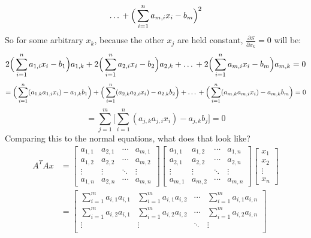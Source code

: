 \documentclass{article}
\begin{document}
\begin{enumerate}
{\[        \dots \\
        +\Big(\sum_{i=1}^n a_{m,i} x_{i} - b_m  \Big)^2\]
  So for some arbitrary $x_k$, because the other $x_j$ are held constant, $\frac{\partial S}{\partial x_k} = 0$  will be:
    \[  2 \Big(\sum_{i=1}^n a_{1,i} x_{i} - b_1 \Big)a_{1,k} +
        2 \Big(\sum_{i=1}^n a_{2,i} x_{i} - b_2 \Big)a_{2,k} +
        \dots \\
        +2 \Big(\sum_{i=1}^n a_{m,i} x_{i} - b_m  \Big)a_{m,k} = 0 \]
    \[ =  \Big(\sum_{i=1}^n (a_{1,k} a_{1,i} x_{i}) - a_{1,k}b_1  \Big) +
         \Big(\sum_{i=1}^n (a_{2,k}a_{2,i} x_{i}) - a_{2,k}b_2  \Big) +
        \dots \\
        + \Big(\sum_{i=1}^n (a_{m,k}a_{m,i} x_{i}) - a_{m,k}b_m \Big) = 0 \]
    \[ =  \sum_{j=1}^m \Bigg[ \sum_{i=1}^n (a_{j,k}a_{j,i} x_{i}) - a_{j,k}b_j \Bigg] = 0 \]
  Comparing this to the normal equations, what does that look like?
  \begin{align*}  
    A^TAx &= 
    \begin{bmatrix}
        a_{1,1} & a_{2,1} & \cdots & a_{m,1} \\
        a_{1,2} & a_{2,2} & \cdots & a_{m,2} \\
        \vdots  & \vdots  & \ddots & \vdots  \\
        a_{1,n} & a_{2,n} & \cdots & a_{m,n} 
    \end{bmatrix}
    \begin{bmatrix}
        a_{1,1} & a_{1,2} & \cdots & a_{1,n} \\
        a_{2,1} & a_{2,2} & \cdots & a_{2,n} \\
        \vdots  & \vdots  & \ddots & \vdots  \\
        a_{m,1} & a_{m,2} & \cdots & a_{m,n} 
    \end{bmatrix}
    \begin{bmatrix}
        x_{1} \\
        x_{2} \\
        \vdots \\
        x_{n}
    \end{bmatrix} \\
    &=
    \begin{bmatrix}
        \sum_{i=1}^m a_{i,1} a_{i,1} & \sum_{i=1}^m a_{i,1} a_{i,2} & \cdots &\sum_{i=1}^m a_{i,1} a_{i,n} \\
        \sum_{i=1}^m a_{i,2} a_{i,1} & \sum_{i=1}^m a_{i,2} a_{i,2} & \cdots & \sum_{i=1}^m a_{i,2} a_{i,n} \\
        \vdots  & \vdots  & \ddots & \vdots  \\

\end{bmatrix}
\end{align*}}
\end{enumerate}
\end{document}
